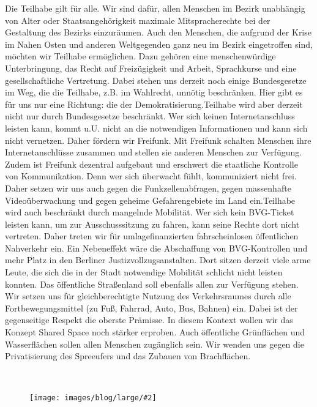\documentclass[a4paper,10pt]{article}
\newcommand{\mysection}[1]{{\vspace{1cm}\noindent\color{gray}{\ttfamily\LARGE\raggedright #1}\\\medskip}}
\newcommand{\abschnitt}[2]{%
\mysection{\raggedright #1}%
\begin{figure}[t]%
\vspace*{-2.7cm}%
\hspace*{-2.1cm}%
\texttt{[image: images/blog/large/\#2]} %
\end{figure}%
}
\begin{document}
\enlargethispage{1em}
Die Teilhabe gilt für alle. Wir sind dafür, allen Menschen im Bezirk
unabhängig von Alter oder Staatsangehörigkeit maximale Mitspracherechte
bei der Gestaltung des Bezirks einzuräumen. Auch den Menschen, die
aufgrund der Krise im Nahen Osten und anderen Weltgegenden ganz neu im
Bezirk eingetroffen sind, möchten wir Teilhabe ermöglichen. Dazu gehören
eine menschenwürdige Unterbringung, das Recht auf Freizügigkeit und
Arbeit, Sprachkurse und eine gesellschaftliche Vertretung. Dabei stehen
uns derzeit noch einige Bundesgesetze im Weg, die die Teilhabe, z.B. im
Wahlrecht, unnötig beschränken. Hier gibt es für uns nur eine Richtung:
die der Demokratisierung.Teilhabe wird aber derzeit nicht nur durch
Bundesgesetze beschränkt. 
Wer sich keinen Internetanschluss leisten
kann, kommt u.U. nicht an die notwendigen Informationen und kann sich
nicht vernetzen. Daher fördern wir Freifunk. Mit Freifunk schalten
Menschen ihre Internetanschlüsse zusammen und stellen sie anderen
Menschen zur Verfügung. Zudem ist Freifunk dezentral aufgebaut und
erschwert die staatliche Kontrolle von Kommunikation. Denn wer sich
überwacht fühlt, kommuniziert nicht frei. Daher setzen wir uns auch
gegen die Funkzellenabfragen, gegen massenhafte Videoüberwachung und
gegen geheime Gefahrengebiete im Land ein.Teilhabe wird auch beschränkt
durch mangelnde Mobilität. 
\enlargethispage{1em}
Wer sich kein BVG-Ticket leisten kann, um zur
Ausschusssitzung zu fahren, kann seine Rechte dort nicht vertreten.
Daher treten wir für umlagefinanzierten fahrscheinlosen öffentlichen
Nahverkehr ein. Ein Nebeneffekt wäre die Abschaffung von BVG-Kontrollen
und mehr Platz in den Berliner Justizvollzugsanstalten. Dort sitzen
derzeit viele arme Leute, die sich die in der Stadt notwendige Mobilität
schlicht nicht leisten konnten. Das öffentliche Straßenland soll
ebenfalls allen zur Verfügung stehen. Wir setzen uns für
gleichberechtigte Nutzung des Verkehrsraumes durch alle
Fortbewegungsmittel (zu Fuß, Fahrrad, Auto, Bus, Bahnen) ein. Dabei ist
der gegenseitige Respekt die oberste Prämisse. In diesem Kontext wollen
wir das Konzept Shared Space noch stärker erproben. Auch öffentliche
Grünflächen und Wasserflächen sollen allen Menschen zugänglich sein. Wir
wenden uns gegen die Privatisierung des Spreeufers und das Zubauen von
Brachflächen.

\abschnitt{}{plakat_katze.png}
\end{document}

